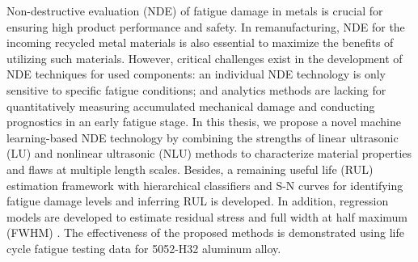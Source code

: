 Non-destructive evaluation (NDE) of fatigue damage in metals is crucial for ensuring high product performance and safety. In remanufacturing, NDE for the incoming recycled metal materials is also essential to maximize the benefits of utilizing such materials. However, critical challenges exist in the development of NDE techniques for used components: an individual NDE technology is only sensitive to specific fatigue conditions; and analytics methods are lacking for quantitatively measuring accumulated mechanical damage and conducting prognostics in an early fatigue stage. In this thesis, we propose a novel machine learning-based NDE technology by combining the strengths of linear ultrasonic (LU) and nonlinear ultrasonic (NLU) methods to characterize material properties and flaws at multiple length scales. Besides, a remaining useful life (RUL) estimation framework with hierarchical classifiers and S-N curves for identifying fatigue damage levels and inferring RUL is developed. In addition, regression models are developed to estimate residual stress and full width at half maximum (FWHM) . The effectiveness of the proposed methods is demonstrated using life cycle fatigue testing data for 5052-H32 aluminum alloy.
